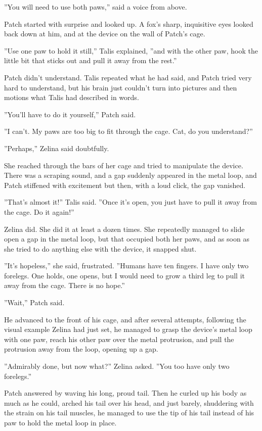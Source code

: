 \documentclass[12pt]{book}
\begin{document}
''You will need to use both paws,'' said a voice from above.

Patch started with surprise and looked up. A fox's sharp, inquisitive eyes looked back down at him, and at the device on the wall of Patch's cage.

''Use one paw to hold it still,'' Talis explained, ''and with the other paw, hook the little bit that sticks out and pull it away from the rest.''

Patch didn't understand. Talis repeated what he had said, and Patch tried very hard to understand, but his brain just couldn't turn into pictures and then motions what Talis had described in words.

''You'll have to do it yourself,'' Patch said.

''I can't. My paws are too big to fit through the cage. Cat, do you understand?''

''Perhaps,'' Zelina said doubtfully.

She reached through the bars of her cage and tried to manipulate the device. There was a scraping sound, and a gap suddenly appeared in the metal loop, and Patch stiffened with excitement %
but then, with a loud click, the gap vanished.

''That's almost it!'' Talis said. ''Once it's open, you just have to pull it away from the cage. Do it again!''

Zelina did. She did it at least a dozen times. She repeatedly managed to slide open a gap in the metal loop, but that occupied both her paws, and as soon as she tried to do anything else with the device, it snapped shut.

''It's hopeless,'' she said, frustrated. ''Humans have ten fingers. I have only two forelegs. One holds, one opens, but I would need to grow a third leg to pull it away from the cage. There is no hope.''

''Wait,'' Patch said.

He advanced to the front of his cage, and after several attempts, following the visual example Zelina had just set, he managed to grasp the device's metal loop with one paw, reach his other paw over the metal protrusion, and pull the protrusion away from the loop, opening up a gap.

''Admirably done, but now what?'' Zelina asked. ''You too have only two forelegs.''

Patch answered by waving his long, proud tail. Then he curled up his body as much as he could, arched his tail over his head, and just barely, shuddering with the strain on his tail muscles, he managed to use the tip of his tail instead of his paw to hold the metal loop in place.
\end{document}
